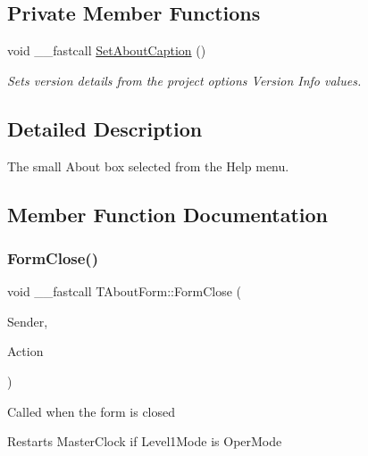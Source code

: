 \subsection*{Private Member Functions}
\begin{DoxyCompactItemize}
\item 
\mbox{\label{class_t_about_form_aae86823c5d44708f264e2c1f8cd52af1}} 
void \+\_\+\+\_\+fastcall \mbox{\hyperlink{class_t_about_form_aae86823c5d44708f264e2c1f8cd52af1}{Set\+About\+Caption}} ()
\begin{DoxyCompactList}\small\item\em Sets version details from the project options \textquotesingle{}Version Info\textquotesingle{} values. \end{DoxyCompactList}\end{DoxyCompactItemize}


\subsection{Detailed Description}
The small \textquotesingle{}About\textquotesingle{} box selected from the Help menu. 

\subsection{Member Function Documentation}
\mbox{\label{class_t_about_form_acddaba886282fa0cb6aa0ee77520fb05}} 
\subsubsection{\texorpdfstring{Form\+Close()}{FormClose()}}
{\footnotesize\ttfamily void \+\_\+\+\_\+fastcall T\+About\+Form\+::\+Form\+Close (\begin{DoxyParamCaption}\item[{T\+Object $\ast$}]{Sender,  }\item[{T\+Close\+Action \&}]{Action }\end{DoxyParamCaption})}

Called when the form is closed

Restarts Master\+Clock if Level1\+Mode is Oper\+Mode \mbox{\label{class_t_about_form_ad2cb3d318c91018ed8986c8315ccd52b}} 

